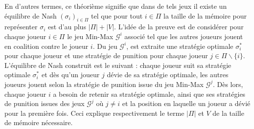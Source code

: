 En d'autres termes, ce théorième signifie que dans de tels jeux il existe un équilibre de Nash $(\sigma_i)_{i\in \Pi}$ tel que pour tout $i \in \Pi$ la taille de la mémoire pour représenter $\sigma_i$ est d'au plus $|\Pi| + |V|$. L'idée de la preuve est de considérer  pour chaque joueur $i \in \Pi$ le jeu Min-Max $\mathcal{G}^i$ associé tel que les autres joueurs jouent en coalition contre le joueur $i$. Du jeu $\mathcal{G}^i$, est extraite une stratégie optimale $\sigma_i^*$ pour chaque joueur et une stratégie de punition pour chaque joueur $j \in \Pi \backslash \{i\}$. L'équilibre de Nash construit est le suivant : chaque joueur suit sa stratégie optimale $\sigma_i^*$ et dès qu'un joueur $j$ dévie de sa stratégie optimale, les autres joueurs jouent selon la stratégie de punition issue du jeu Min-Max $\mathcal{G}^j$. Dès lors, chaque joueur $i$ a besoin de retenir sa stratégie optimale, ainsi que ses stratégies de punition issues des jeux $\mathcal{G}^j$ où $j \neq i$ et la position en laquelle un joueur a dévié pour la première fois. Ceci explique respectivement le terme $|\Pi|$ et $V$ de la taille de mémoire nécessaire.
